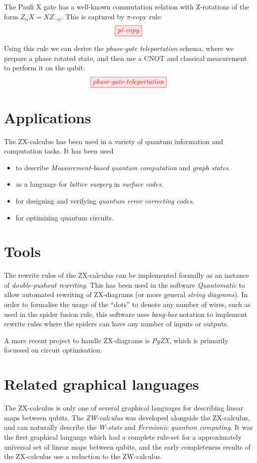 \documentclass[a4paper, 12pt]{article}
\begin{document}
The Pauli X gate has a well-known commutation relation with Z-rotations of the form $Z_\alpha X = XZ_{-\alpha}$. This is captured by $\pi$-copy rule:
\begin{equation*}
        \tikzfig{pi-copy}
\end{equation*}

Using this rule we can derive the \emph{phase-gate teleportation} schema, where we prepare a phase rotated state, and then use a CNOT and classical measurement to perform it on the qubit:
\begin{equation*}
    \tikzfig{phase-gate-teleportation}
\end{equation*}


\section{Applications}
The ZX-calculus has been used in a variety of quantum information and computation tasks. It has been used
\begin{itemize}
  \item to describe \emph{Measurement-based quantum computation} and \emph{graph states}.
  \item as a language for \emph{lattice surgery} in \emph{surface codes}. 
  \item for designing and verifying \emph{quantum error correcting codes}.
  \item for optimizing quantum circuits.
\end{itemize}
 

\section{Tools}
The rewrite rules of the ZX-calculus can be implemented formally as an instance of \emph{double-pushout rewriting}. This has been used in the software \emph{Quantomatic} to allow automated rewriting of ZX-diagrams (or more general \emph{string diagrams}). In order to formalise the usage of the ``dots'' to denote any number of wires, such as used in the spider fusion rule, this software uses \emph{bang-box} notation to implement rewrite rules where the spiders can have any number of inputs or outputs.

A more recent project to handle ZX-diagrams is \emph{PyZX}, which is primarily focussed on circuit optimisation.


\section{Related graphical languages}
The ZX-calculus is only one of several graphical languages for describing linear maps between qubits. The \emph{ZW-calculus} was developed alongside the ZX-calculus, and can naturally describe the \emph{W-state} and \emph{Fermionic quantum computing}. It was the first graphical language which had a complete rule-set for a approximately universal set of linear maps between qubits, and the early completeness results of the ZX-calculus use a reduction to the ZW-calculus.
\end{document}
